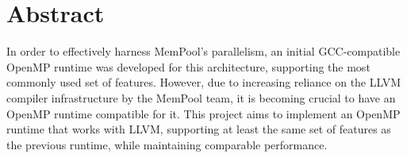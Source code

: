 \chapter*{Abstract}

In order to effectively harness MemPool's parallelism, an initial GCC-compatible OpenMP runtime was
developed for this architecture, supporting the most commonly used set of features. However, due to
increasing reliance on the LLVM compiler infrastructure by the MemPool team, it is becoming crucial
to have an OpenMP runtime compatible for it. This project aims to implement an OpenMP runtime that
works with LLVM, supporting at least the same set of features as the previous runtime, while
maintaining comparable performance.


%
%
%
